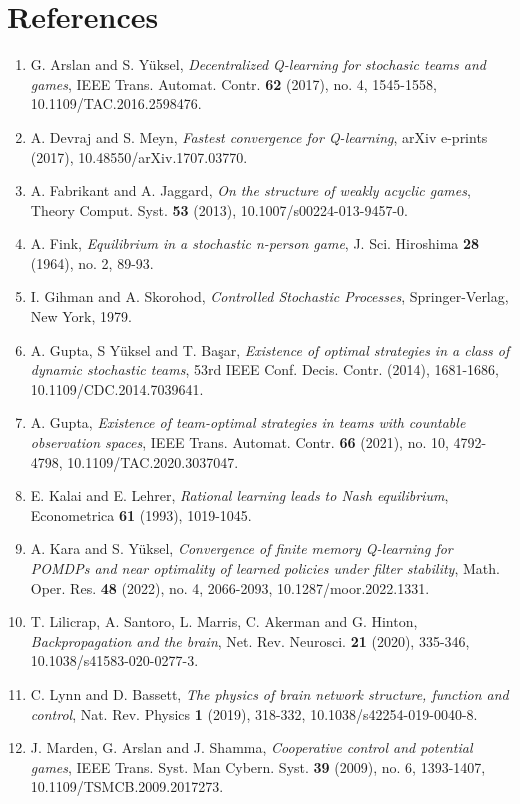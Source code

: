 \documentclass[10pt]{article}
\newcommand{\1}[1]{\mathbbm{1}_{#1}}
\begin{document}
\section*{References}
    \begin{enumerate}
        \item G. Arslan and S. Y\"uksel, {\it Decentralized Q-learning for stochasic teams and games}, IEEE Trans. Automat. Contr. {\bf 62} (2017), no. 4, 1545-1558, 10.1109/TAC.2016.2598476.
        \item A. Devraj and  S. Meyn, {\it Fastest convergence for Q-learning}, arXiv e-prints (2017), 10.48550/arXiv.1707.03770.
        \item A. Fabrikant and A. Jaggard, {\it On the structure of weakly acyclic games}, Theory Comput. Syst. {\bf 53} (2013), 10.1007/s00224-013-9457-0.
        \item A. Fink, {\it Equilibrium in a stochastic n-person game}, J. Sci. Hiroshima {\bf 28} (1964), no. 2, 89-93.
        \item I. Gihman and A. Skorohod, {\it Controlled Stochastic Processes}, Springer-Verlag, New York, 1979.
        \item A. Gupta, S Y\"uksel and T. Ba\c sar, {\it Existence of optimal strategies in a class of dynamic stochastic teams}, 53rd IEEE Conf. Decis. Contr. (2014), 1681-1686, 10.1109/CDC.2014.7039641.
        \item A. Gupta, {\it Existence of team-optimal strategies in teams with countable observation spaces}, IEEE Trans. Automat. Contr. {\bf 66} (2021), no. 10, 4792-4798, 10.1109/TAC.2020.3037047.
        \item E. Kalai and E. Lehrer, {\it Rational learning leads to Nash equilibrium}, Econometrica {\bf 61} (1993), 1019-1045.
        \item A. Kara and S. Y\"uksel, {\it Convergence of finite memory Q-learning for POMDPs and near optimality of learned policies under filter stability}, Math. Oper. Res. {\bf 48} (2022), no. 4, 2066-2093, 10.1287/moor.2022.1331.
        \item T. Lilicrap, A. Santoro, L. Marris, C. Akerman and G. Hinton, {\it Backpropagation and the brain}, Net. Rev. Neurosci. {\bf 21} (2020), 335-346, 10.1038/s41583-020-0277-3.
        \item C. Lynn and D. Bassett, {\it The physics of brain network structure, function and control}, Nat. Rev. Physics {\bf 1} (2019), 318-332, 10.1038/s42254-019-0040-8.
        \item J. Marden, G. Arslan and J. Shamma, {\it Cooperative control and potential games}, IEEE Trans. Syst. Man Cybern. Syst. {\bf 39} (2009), no. 6, 1393-1407, 10.1109/TSMCB.2009.2017273.

\end{enumerate}
\end{document}
